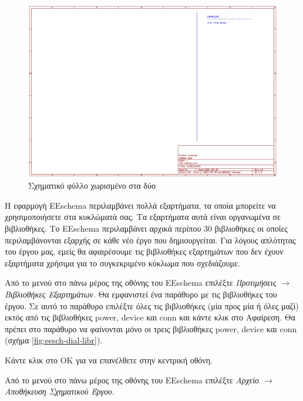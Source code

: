 \documentclass[a4paper]{article}
\begin{document}
\begin{figure}
  \begin{center}
    \includegraphics[width=.9\textwidth]{img/eesch-main-lines.png}
    \caption{Σχηματικό φύλλο χωρισμένο στα δύο}
    \label{fig:eesch-main-lines}
  \end{center}
\end{figure}

Η εφαρμογή \textenglish{EEschema} περιλαμβάνει πολλά εξαρτήματα, τα οποία μπορείτε να χρησιμοποιήσετε στα κυκλώματά σας. Τα εξαρτήματα αυτά είναι οργανωμένα σε βιβλιοθήκες. Το \textenglish{EEschema} περιλαμβάνει αρχικά περίπου 30 βιβλιοθήκες οι οποίες περιλαμβάνονται εξαρχής σε κάθε νέο έργο που δημιουργείται. Για λόγους απλότητας του έργου μας, εμείς θα αφαιρέσουμε τις βιβλιοθήκες εξαρτημάτων που δεν έχουν εξαρτήματα χρήσιμα για το συγκεκριμένο κύκλωμα που σχεδιάζουμε.

Από το μενού στο πάνω μέρος της οθόνης του \textenglish{EEschema} επιλέξτε \textit{Προτιμήσεις $\rightarrow$ Βιβλιοθήκες Εξαρτημάτων}. Θα εμφανιστεί ένα παράθυρο με τις βιβλιοθήκες του έργου. Σε αυτό το παράθυρο επιλέξτε όλες τις βιβλιοθήκες (μία προς μία ή όλες μαζί) εκτός από τις βιβλιοθήκες power, device και conn και κάντε κλικ στο Αφαίρεση. Θα πρέπει στο παράθυρο να φαίνονται μόνο οι τρεις βιβλιοθήκες power, device και conn (σχήμα \ref{fig:eesch-dial-libr}). 

Κάντε κλικ στο ΟΚ για να επανέλθετε στην κεντρική οθόνη.

Από το μενού στο πάνω μέρος της οθόνης του \textenglish{EEschema} επιλέξτε \textit{Αρχείο $\rightarrow$ Αποθήκευση Σχηματικού Έργου}.
\end{document}
